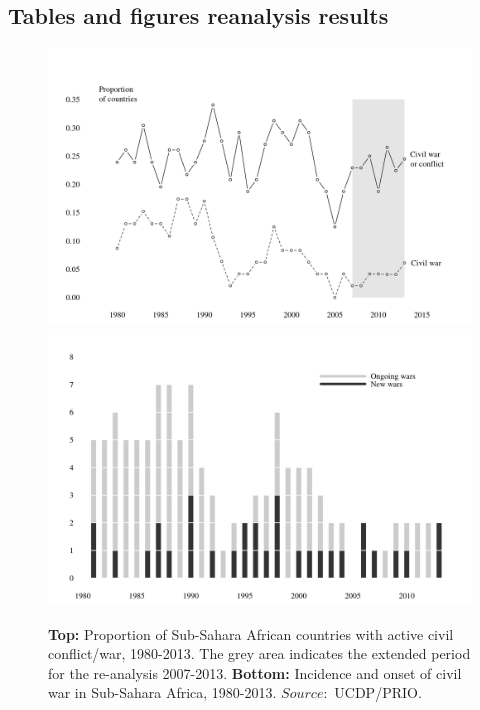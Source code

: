 \documentclass[a4paper,11pt]{article}
\begin{document}
\subsection{Tables and figures reanalysis results}
\setcounter{table}{0}
\renewcommand{\thetable}{B\arabic{table}}
\setcounter{figure}{0}
\renewcommand{\thefigure}{B\arabic{figure}}
\begin{figure}[!h]
\centering
\includegraphics[width=1\textwidth]{proportion.png}\\ 
\includegraphics[width=1\textwidth]{ongoing_onset.png}
\caption[Conflict trends over time]{\textbf{Top:} Proportion of Sub-Sahara African countries with active civil conflict/war, 1980-2013. The grey area indicates the extended period for the re-analysis 2007-2013. \textbf{Bottom:} Incidence and onset of civil war in Sub-Sahara Africa, 1980-2013. $Source:$ UCDP/PRIO.}
\label{fig:conflict_trends}
\end{figure}
\end{document}
